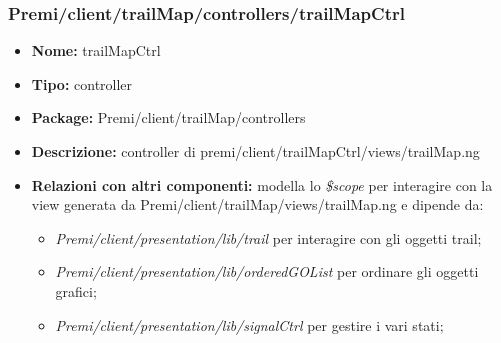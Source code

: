 \subsubsection{Premi/client/trailMap/controllers/trailMapCtrl}
\begin{itemize}
  \item[] \textbf{Nome:} trailMapCtrl
  \item[] \textbf{Tipo:} controller
  \item[] \textbf{Package:} Premi/client/trailMap/controllers
  \item[] \textbf{Descrizione:} controller di premi/client/trailMapCtrl/views/trailMap.ng
  \item[] \textbf{Relazioni con altri componenti:} modella lo \textit{\$scope} per interagire con la view generata da Premi/client/trailMap/views/trailMap.ng e dipende da:
  \begin{itemize}
  	\item \textit{Premi/client/presentation/lib/trail} per interagire con gli oggetti trail;
  	\item \textit{Premi/client/presentation/lib/orderedGOList} per ordinare gli oggetti grafici;
  	\item \textit{Premi/client/presentation/lib/signalCtrl} per gestire i vari stati;
  \end{itemize}
\end{itemize}















